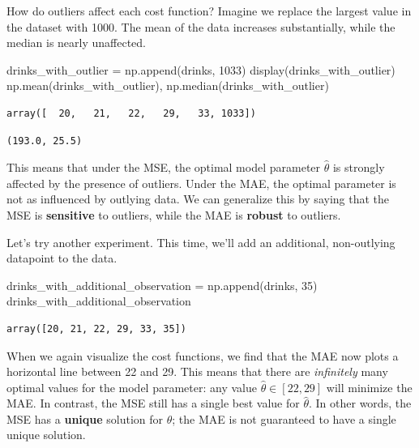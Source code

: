 \documentclass[
  letterpaper,
  DIV=11,
  numbers=noendperiod]{scrreprt}
\newenvironment{Shaded}{\begin{snugshade}}{\end{snugshade}}
\newcommand{\DecValTok}[1]{\textcolor[rgb]{0.68,0.00,0.00}{#1}}
\newcommand{\NormalTok}[1]{\textcolor[rgb]{0.00,0.23,0.31}{#1}}
\newcommand{\OperatorTok}[1]{\textcolor[rgb]{0.37,0.37,0.37}{#1}}
\begin{document}
How do outliers affect each cost function? Imagine we replace the
largest value in the dataset with 1000. The mean of the data increases
substantially, while the median is nearly unaffected.

\begin{Shaded}
\begin{Highlighting}[]
\NormalTok{drinks\_with\_outlier }\OperatorTok{=}\NormalTok{ np.append(drinks, }\DecValTok{1033}\NormalTok{)}
\NormalTok{display(drinks\_with\_outlier)}
\NormalTok{np.mean(drinks\_with\_outlier), np.median(drinks\_with\_outlier)}
\end{Highlighting}
\end{Shaded}

\begin{verbatim}
array([  20,   21,   22,   29,   33, 1033])
\end{verbatim}

\begin{verbatim}
(193.0, 25.5)
\end{verbatim}

This means that under the MSE, the optimal model parameter
\(\hat{\theta}\) is strongly affected by the presence of outliers. Under
the MAE, the optimal parameter is not as influenced by outlying data. We
can generalize this by saying that the MSE is \textbf{sensitive} to
outliers, while the MAE is \textbf{robust} to outliers.

Let's try another experiment. This time, we'll add an additional,
non-outlying datapoint to the data.

\begin{Shaded}
\begin{Highlighting}[]
\NormalTok{drinks\_with\_additional\_observation }\OperatorTok{=}\NormalTok{ np.append(drinks, }\DecValTok{35}\NormalTok{)}
\NormalTok{drinks\_with\_additional\_observation}
\end{Highlighting}
\end{Shaded}

\begin{verbatim}
array([20, 21, 22, 29, 33, 35])
\end{verbatim}

When we again visualize the cost functions, we find that the MAE now
plots a horizontal line between 22 and 29. This means that there are
\emph{infinitely} many optimal values for the model parameter: any value
\(\hat{\theta} \in [22, 29]\) will minimize the MAE. In contrast, the
MSE still has a single best value for \(\hat{\theta}\). In other words,
the MSE has a \textbf{unique} solution for \(\hat{\theta}\); the MAE is
not guaranteed to have a single unique solution.
\end{document}
